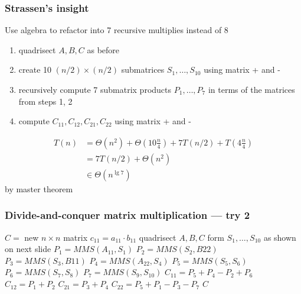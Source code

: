\documentclass{beamer}
\begin{document}
\begin{frame} \frametitle{Strassen's insight}
Use algebra to refactor into 7 recursive multiplies instead of 8
\begin{enumerate}
  \item quadrisect $A, B, C$ as before
  \item create 10 $(n/2) \times (n/2)$ submatrices $S_1, \ldots, S_{10}$ using
    matrix + and -
  \item recursively compute 7 submatrix products $P_1, \ldots, P_7$ in terms of
    the matrices from steps 1, 2
  \item compute $C_{11}, C_{12}, C_{21}, C_{22}$ using matrix + and -
\end{enumerate}
\begin{align*}
  T(n) &= \Theta(n^2) + \Theta(10 \frac{n}{4}) + 7 T(n/2) + T(4 \frac{n}{4}) \\
       &= 7 T(n/2) + \Theta(n^2) \\
       &\in \Theta(n^{\lg 7})
\end{align*}
by master theorem
\end{frame}
\begin{frame} \frametitle{Divide-and-conquer matrix multiplication --- try 2}
  {\tiny
  \begin{algorithmic}[1]
    \State $C = $ new $n \times n$ matrix
      \State $c_{11} = a_{11} \cdot b_{11}$
    \Else
      \State quadrisect $A, B, C$
      \State form $S_1, \ldots, S_{10}$ as shown on next slide
      \State $P_1 = MMS(A_{11}, S_1)$
      \State $P_2 = MMS(S_2, B{22})$
      \State $P_3 = MMS(S_3, B{11})$
      \State $P_4 = MMS(A_{22}, S_4)$
      \State $P_5 = MMS(S_5, S_6)$
      \State $P_6 = MMS(S_7, S_8)$
      \State $P_7 = MMS(S_9, S_{10})$
      \State $C_{11} = P_5 + P_4 - P_2 + P_6$
      \State $C_{12} = P_1 + P_2$
      \State $C_{21} = P_3 + P_4$
      \State $C_{22} = P_5 + P_1 - P_3 - P_7$
    \EndIf
    \State \Return $C$
    \EndFunction
  \end{algorithmic}
  }
\end{frame}
\end{document}
